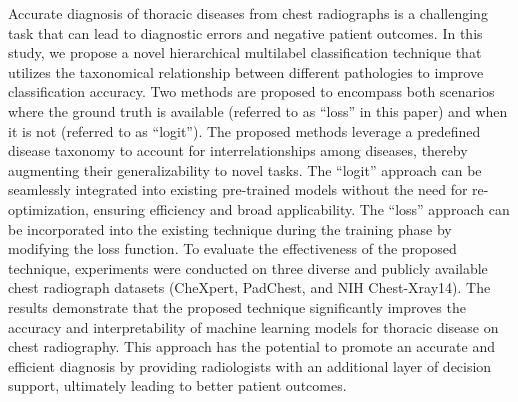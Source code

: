 Accurate diagnosis of thoracic diseases from chest radiographs is a challenging task that can lead to diagnostic errors and negative patient outcomes. In this study, we propose a novel hierarchical multilabel classification technique that utilizes the taxonomical relationship between different pathologies to improve classification accuracy. Two methods are proposed to encompass both scenarios where the ground truth is available (referred to as ``loss'' in this paper) and when it is not (referred to as ``logit'').  The proposed methods leverage a predefined disease taxonomy to account for interrelationships among diseases, thereby augmenting their generalizability to novel tasks.  The ``logit'' approach can be seamlessly integrated into existing pre-trained models without the need for re-optimization, ensuring efficiency and broad applicability. The ``loss'' approach can be incorporated into the existing technique during the training phase by modifying the loss function.  To evaluate the effectiveness of the proposed technique, experiments were conducted on three diverse and publicly available chest radiograph datasets (CheXpert, PadChest, and NIH Chest-Xray14). The results demonstrate that the proposed technique significantly improves the accuracy and interpretability of machine learning models for thoracic disease on chest radiography. This approach has the potential to promote an accurate and efficient diagnosis by providing radiologists with an additional layer of decision support, ultimately leading to better patient outcomes.

